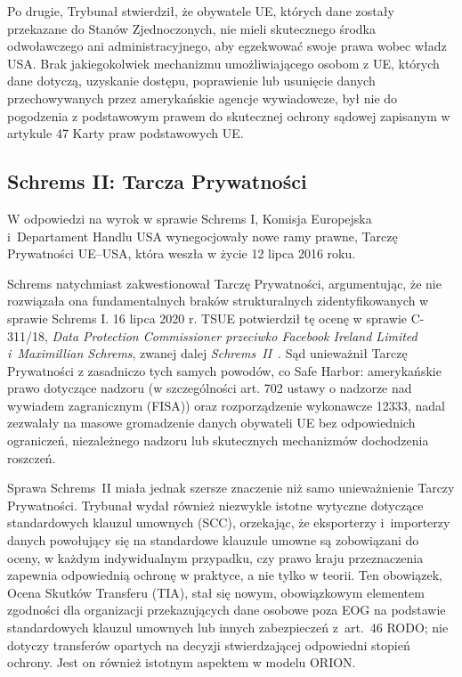 Po drugie, Trybunał stwierdził, że obywatele UE, których dane zostały przekazane do Stanów Zjednoczonych, nie mieli skutecznego środka odwoławczego ani administracyjnego, aby egzekwować swoje prawa wobec władz USA. Brak jakiegokolwiek mechanizmu umożliwiającego osobom z UE, których dane dotyczą,
uzyskanie dostępu, poprawienie lub usunięcie danych przechowywanych przez amerykańskie agencje wywiadowcze, był nie do pogodzenia z podstawowym prawem do skutecznej ochrony sądowej zapisanym w artykule 47 Karty praw podstawowych UE.

\subsection{Schrems II: Tarcza Prywatności}
W odpowiedzi na wyrok w sprawie Schrems I, Komisja Europejska i~Departament Handlu USA wynegocjowały nowe ramy prawne, Tarczę Prywatności UE–USA, która weszła w życie 12 lipca 2016 roku.

Schrems natychmiast zakwestionował Tarczę Prywatności, argumentując, że nie rozwiązała ona fundamentalnych braków strukturalnych zidentyfikowanych w sprawie Schrems I. 16 lipca 2020 r. TSUE potwierdził tę ocenę w sprawie C-311/18, \textit{Data Protection Commissioner przeciwko Facebook Ireland Limited i~Maximillian Schrems}, zwanej dalej \textit{Schrems~II}~\autocite{CJEU2020SchremsII}. Sąd unieważnił Tarczę Prywatności z zasadniczo tych samych powodów, co Safe Harbor: amerykańskie prawo dotyczące nadzoru (w szczególności art. 702 ustawy o nadzorze nad wywiadem zagranicznym (FISA)) oraz rozporządzenie wykonawcze 12333, nadal zezwalały na masowe gromadzenie danych obywateli UE bez odpowiednich ograniczeń, niezależnego nadzoru lub skutecznych mechanizmów dochodzenia roszczeń.

Sprawa Schrems~II miała jednak szersze znaczenie niż samo unieważnienie Tarczy Prywatności. Trybunał wydał również niezwykle istotne wytyczne dotyczące standardowych klauzul umownych (SCC), orzekając, że eksporterzy i~importerzy danych powołujący się na standardowe klauzule umowne są zobowiązani do oceny, w każdym indywidualnym przypadku, czy prawo kraju przeznaczenia zapewnia odpowiednią ochronę w praktyce, a nie tylko w teorii. Ten obowiązek, Ocena Skutków Transferu (TIA), stał się nowym, obowiązkowym elementem zgodności dla organizacji przekazujących dane osobowe poza EOG na podstawie standardowych klauzul umownych lub innych zabezpieczeń z~art.~46 RODO; nie dotyczy transferów opartych na decyzji stwierdzającej odpowiedni stopień ochrony. Jest on również istotnym aspektem w modelu ORION.

